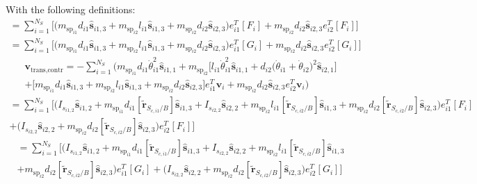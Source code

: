 \documentclass[paper]{aiaaNew}
\begin{document}
With the following definitions:
\begin{multline}
[A_{\text{contr}}] = \sum_{i=1}^{N_{S}}\bigg[\Big(m_{\text{sp}_{i1}}d_{i1} \bm{\hat{s}}_{i1,3} +m_{\text{sp}_{i2}}l_{i1} \bm{\hat{s}}_{i1,3}+m_{\text{sp}_{i2}} d_{i2}\bm{\hat{s}}_{i2,3}\Big)e_{i1}^T[F_i] +m_{\text{sp}_{i2}} d_{i2} \bm{\hat{s}}_{i2,3}e_{i2}^T[F_i] \bigg]
\end{multline}\begin{multline}
[B_{\text{contr}}] =  \sum_{i=1}^{N_{S}}\bigg[\Big(m_{\text{sp}_{i1}}d_{i1} \bm{\hat{s}}_{i1,3} +m_{\text{sp}_{i2}}l_{i1}\bm{\hat{s}}_{i1,3}+m_{\text{sp}_{i2}} d_{i2}\bm{\hat{s}}_{i2,3}\Big) e_{i1}^T[G_i] +m_{\text{sp}_{i2}} d_{i2} \bm{\hat{s}}_{i2,3} e_{i2}^T[G_i]\bigg]
\end{multline}\begin{multline}
\bm v_{\text{trans,contr}} = -\sum_{i=1}^{N_{S}}\bigg(m_{\text{sp}_{i1}}d_{i1} \dot{\theta}_{i1}^2 \bm{\hat{s}}_{i1,1} +m_{\text{sp}_{i2}}\Big[l_{i1} \dot{\theta}_{i1}^2 \bm{\hat{s}}_{i1,1} + d_{i2}\big(\dot{\theta}_{i1} + \dot{\theta}_{i2}\big)^2\bm{\hat{s}}_{i2,1}\Big]\\
+\Big[m_{\text{sp}_{i1}}d_{i1} \bm{\hat{s}}_{i1,3} +m_{\text{sp}_{i2}}l_{i1} \bm{\hat{s}}_{i1,3}+m_{\text{sp}_{i2}} d_{i2}\bm{\hat{s}}_{i2,3}\Big]e_{i1}^T\bm v_i 
+m_{\text{sp}_{i2}} d_{i2} \bm{\hat{s}}_{i2,3}e_{i2}^T\bm v_i \bigg) 
\end{multline}\begin{multline}
[C_{\text{contr}}] = \sum\limits_{i=1}^{N_S} \bigg[  \big(I_{s_{i1,2}}\bm{\hat{s}}_{i1,2}+m_{\text{sp}_{i1}}d_{i1} [\tilde{\bm{r}}_{S_{c,i1}/B}]   \bm{\hat{s}}_{i1,3} + I_{s_{i2,2}}\bm{\hat{s}}_{i2,2}
+m_{\text{sp}_{i2}}l_{i1} [\tilde{\bm{r}}_{S_{c,i2}/B}]  \bm{\hat{s}}_{i1,3}+m_{\text{sp}_{i2}}d_{i2} [\tilde{\bm{r}}_{S_{c,i2}/B}] \bm{\hat{s}}_{i2,3}\big)e_{i1}^T[F_i]\\
+\big( I_{s_{i2,2}}\bm{\hat{s}}_{i2,2}+m_{\text{sp}_{i2}} d_{i2} [\tilde{\bm{r}}_{S_{c,i2}/B}] \bm{\hat{s}}_{i2,3}\big)e_{i2}^T[F_i] \bigg]
\end{multline}\begin{multline}
[D_{\text{contr}}] = \sum\limits_{i=1}^{N_S} \bigg[  \big(I_{s_{i1,2}}\bm{\hat{s}}_{i1,2}+m_{\text{sp}_{i1}}d_{i1} [\tilde{\bm{r}}_{S_{c,i1}/B}]   \bm{\hat{s}}_{i1,3} + I_{s_{i2,2}}\bm{\hat{s}}_{i2,2}+m_{\text{sp}_{i2}}l_{i1} [\tilde{\bm{r}}_{S_{c,i2}/B}]  \bm{\hat{s}}_{i1,3}\\
+m_{\text{sp}_{i2}}d_{i2} [\tilde{\bm{r}}_{S_{c,i2}/B}] \bm{\hat{s}}_{i2,3}\big)e_{i1}^T[G_i] +\big( I_{s_{i2,2}}\bm{\hat{s}}_{i2,2}+m_{\text{sp}_{i2}} d_{i2} [\tilde{\bm{r}}_{S_{c,i2}/B}] \bm{\hat{s}}_{i2,3}\big)e_{i2}^T[G_i] \bigg]\

\end{multline}
\end{document}
